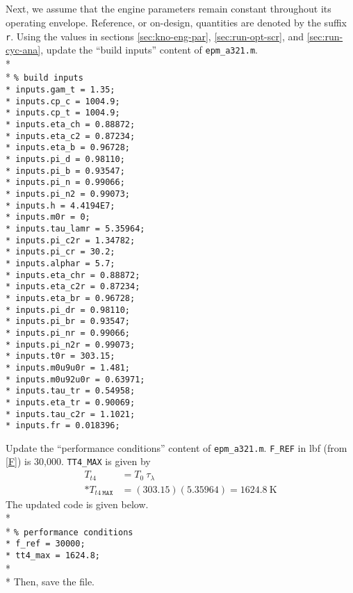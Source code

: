 \documentclass[12pt,twoside]{article}
\begin{document}
\subparagraph{}
Next, we assume that the engine parameters remain constant throughout its operating envelope.  Reference, or on-design, quantities are denoted by the suffix \texttt{r}.  Using the values in sections \ref{sec:kno-eng-par}, \ref{sec:run-opt-scr}, and \ref{sec:run-cyc-ana}, update the ``build inputs'' content of \texttt{epm\_a321.m}.\\*
\\*
\texttt{\% build inputs \\*
inputs.gam\_t = 1.35; \\*
inputs.cp\_c = 1004.9; \\*
inputs.cp\_t = 1004.9; \\*
inputs.eta\_ch = 0.88872; \\*
inputs.eta\_c2 = 0.87234; \\*
inputs.eta\_b = 0.96728; \\*
inputs.pi\_d = 0.98110; \\*
inputs.pi\_b = 0.93547; \\*
inputs.pi\_n = 0.99066; \\*
inputs.pi\_n2 = 0.99073; \\*
inputs.h = 4.4194E7; \\*
inputs.m0r = 0; \\*
inputs.tau\_lamr = 5.35964; \\*
inputs.pi\_c2r = 1.34782; \\*
inputs.pi\_cr = 30.2; \\*
inputs.alphar = 5.7; \\*
inputs.eta\_chr = 0.88872; \\*
inputs.eta\_c2r = 0.87234; \\*
inputs.eta\_br = 0.96728; \\*
inputs.pi\_dr = 0.98110; \\*
inputs.pi\_br = 0.93547; \\*
inputs.pi\_nr = 0.99066; \\*
inputs.pi\_n2r = 0.99073; \\*
inputs.t0r = 303.15; \\*
inputs.m0u9u0r = 1.481; \\*
inputs.m0u92u0r = 0.63971; \\*
inputs.tau\_tr = 0.54958; \\*
inputs.eta\_tr = 0.90069; \\*
inputs.tau\_c2r = 1.1021; \\*
inputs.fr = 0.018396;}

\newpage
Update the ``performance conditions'' content of \texttt{epm\_a321.m}.  \texttt{F\_REF} in lbf (from \eqref{F}) is 30,000.  \texttt{TT4\_MAX} is given by
\begin{align}
  T_{t4} &= T_0~\tau_\lambda\\*
  T_{t4~\texttt{MAX}} &= (303.15)(5.35964) = 1624.8 ~\text{K}
\end{align}
The updated code is given below. \\*
\\*
\texttt{\% performance conditions \\*
f\_ref = 30000; \\*
tt4\_max = 1624.8;} \\*
\\*
Then, save the file.
\end{document}
